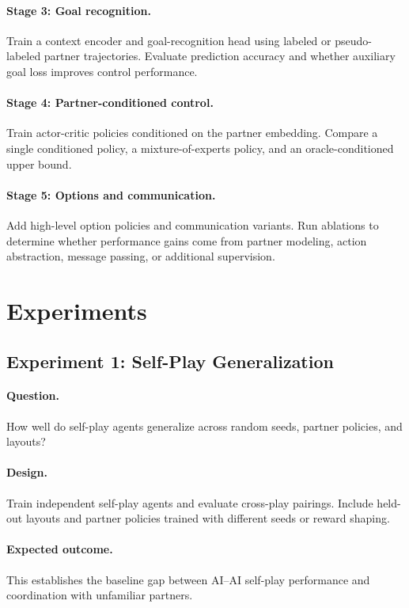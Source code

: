 \documentclass[letterpaper]{article} %
\begin{document}
\paragraph{Stage 3: Goal recognition.}
Train a context encoder and goal-recognition head using labeled or pseudo-labeled partner trajectories. Evaluate prediction accuracy and whether auxiliary goal loss improves control performance.

\paragraph{Stage 4: Partner-conditioned control.}
Train actor-critic policies conditioned on the partner embedding. Compare a single conditioned policy, a mixture-of-experts policy, and an oracle-conditioned upper bound.

\paragraph{Stage 5: Options and communication.}
Add high-level option policies and communication variants. Run ablations to determine whether performance gains come from partner modeling, action abstraction, message passing, or additional supervision.

\section{Experiments}

\subsection{Experiment 1: Self-Play Generalization}

\paragraph{Question.}
How well do self-play agents generalize across random seeds, partner policies, and layouts?

\paragraph{Design.}
Train independent self-play agents and evaluate cross-play pairings. Include held-out layouts and partner policies trained with different seeds or reward shaping.

\paragraph{Expected outcome.}
This establishes the baseline gap between AI--AI self-play performance and coordination with unfamiliar partners.
\end{document}
